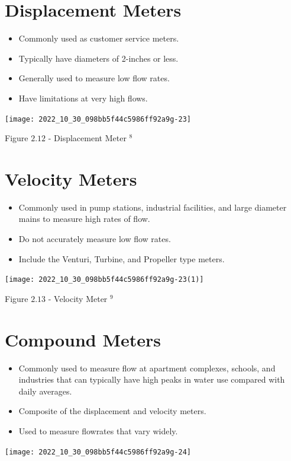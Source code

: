 \documentclass[10pt]{article}
\begin{document}
\section{Displacement Meters}
\begin{itemize}
  \item Commonly used as customer service meters.

  \item Typically have diameters of 2-inches or less.

  \item Generally used to measure low flow rates.

  \item Have limitations at very high flows.

\end{itemize}
\texttt{[image: 2022\_10\_30\_098bb5f44c5986ff92a9g-23]}

Figure $2.12$ - Displacement Meter ${ }^{8}$

\section{Velocity Meters}
\begin{itemize}
  \item Commonly used in pump stations, industrial facilities, and large diameter mains to measure high rates of flow.

  \item Do not accurately measure low flow rates.

  \item Include the Venturi, Turbine, and Propeller type meters.

\end{itemize}
\texttt{[image: 2022\_10\_30\_098bb5f44c5986ff92a9g-23(1)]}

Figure $2.13$ - Velocity Meter ${ }^{9}$

\section{Compound Meters}
\begin{itemize}
  \item Commonly used to measure flow at apartment complexes, schools, and industries that can typically have high peaks in water use compared with daily averages.

  \item Composite of the displacement and velocity meters.

  \item Used to measure flowrates that vary widely.

\end{itemize}
\texttt{[image: 2022\_10\_30\_098bb5f44c5986ff92a9g-24]}
\end{document}

